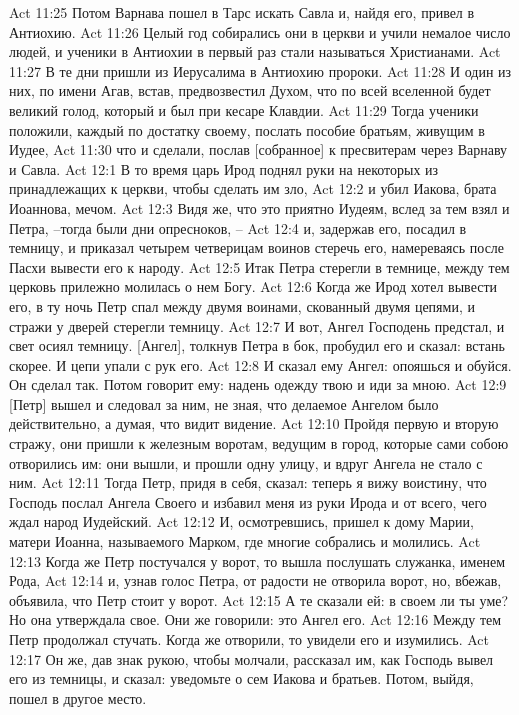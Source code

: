 Act 11:25  Потом Варнава пошел в Тарс искать Савла и, найдя его, привел в Антиохию.
Act 11:26  Целый год собирались они в церкви и учили немалое число людей, и ученики в Антиохии в первый раз стали называться Христианами.
Act 11:27  В те дни пришли из Иерусалима в Антиохию пророки.
Act 11:28  И один из них, по имени Агав, встав, предвозвестил Духом, что по всей вселенной будет великий голод, который и был при кесаре Клавдии.
Act 11:29  Тогда ученики положили, каждый по достатку своему, послать пособие братьям, живущим в Иудее,
Act 11:30  что и сделали, послав [собранное] к пресвитерам через Варнаву и Савла.
Act 12:1  В то время царь Ирод поднял руки на некоторых из принадлежащих к церкви, чтобы сделать им зло,
Act 12:2  и убил Иакова, брата Иоаннова, мечом.
Act 12:3  Видя же, что это приятно Иудеям, вслед за тем взял и Петра, --тогда были дни опресноков, --
Act 12:4  и, задержав его, посадил в темницу, и приказал четырем четверицам воинов стеречь его, намереваясь после Пасхи вывести его к народу.
Act 12:5  Итак Петра стерегли в темнице, между тем церковь прилежно молилась о нем Богу.
Act 12:6  Когда же Ирод хотел вывести его, в ту ночь Петр спал между двумя воинами, скованный двумя цепями, и стражи у дверей стерегли темницу.
Act 12:7  И вот, Ангел Господень предстал, и свет осиял темницу. [Ангел], толкнув Петра в бок, пробудил его и сказал: встань скорее. И цепи упали с рук его.
Act 12:8  И сказал ему Ангел: опояшься и обуйся. Он сделал так. Потом говорит ему: надень одежду твою и иди за мною.
Act 12:9  [Петр] вышел и следовал за ним, не зная, что делаемое Ангелом было действительно, а думая, что видит видение.
Act 12:10  Пройдя первую и вторую стражу, они пришли к железным воротам, ведущим в город, которые сами собою отворились им: они вышли, и прошли одну улицу, и вдруг Ангела не стало с ним.
Act 12:11  Тогда Петр, придя в себя, сказал: теперь я вижу воистину, что Господь послал Ангела Своего и избавил меня из руки Ирода и от всего, чего ждал народ Иудейский.
Act 12:12  И, осмотревшись, пришел к дому Марии, матери Иоанна, называемого Марком, где многие собрались и молились.
Act 12:13  Когда же Петр постучался у ворот, то вышла послушать служанка, именем Рода,
Act 12:14  и, узнав голос Петра, от радости не отворила ворот, но, вбежав, объявила, что Петр стоит у ворот.
Act 12:15  А те сказали ей: в своем ли ты уме? Но она утверждала свое. Они же говорили: это Ангел его.
Act 12:16  Между тем Петр продолжал стучать. Когда же отворили, то увидели его и изумились.
Act 12:17  Он же, дав знак рукою, чтобы молчали, рассказал им, как Господь вывел его из темницы, и сказал: уведомьте о сем Иакова и братьев. Потом, выйдя, пошел в другое место.
